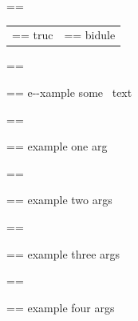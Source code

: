 \documentclass{book}
\makeatletter
\newenvironment{Texinfopreformatted}{%
  \par\GNUTobeylines\obeyspaces\frenchspacing\parskip=\z@\parindent=\z@}{}
{\catcode`\^^M=13 \gdef\GNUTobeylines{\catcode`\^^M=13 \def^^M{\null\par}}}
\newenvironment{Texinfoindented}{\begin{list}{}{}\item\relax}{\end{list}}
\renewcommand{\_}{\Texinfounderscore\discretionary{}{}{}}
\makeatother
\begin{document}
{{\begin{Texinfoindented}
\begin{Texinfopreformatted}
\end{Texinfopreformatted}
\begin{tabular}{m{} m{}}%
\begin{Texinfopreformatted}%
\ttfamily truc \end{Texinfopreformatted}&
\begin{Texinfopreformatted}%
\ttfamily bidule
\end{Texinfopreformatted}\\
\end{tabular}%
\begin{Texinfopreformatted}%
\ttfamily 
\end{Texinfopreformatted}
\begin{Texinfoindented}
\begin{Texinfopreformatted}%
\ttfamily e{-}{-}xample  some
\   text
\end{Texinfopreformatted}
\end{Texinfoindented}
\begin{Texinfopreformatted}%
\ttfamily 
\end{Texinfopreformatted}
\begin{Texinfoindented}
\begin{Texinfopreformatted}%
\ttfamily example one arg
\end{Texinfopreformatted}
\end{Texinfoindented}
\begin{Texinfopreformatted}%
\ttfamily 
\end{Texinfopreformatted}
\begin{Texinfoindented}
\begin{Texinfopreformatted}%
\ttfamily example two args
\end{Texinfopreformatted}
\end{Texinfoindented}
\begin{Texinfopreformatted}%
\ttfamily 
\end{Texinfopreformatted}
\begin{Texinfoindented}
\begin{Texinfopreformatted}%
\ttfamily example three args
\end{Texinfopreformatted}
\end{Texinfoindented}
\begin{Texinfopreformatted}%
\ttfamily 
\end{Texinfopreformatted}
\begin{Texinfoindented}
\begin{Texinfopreformatted}%
\ttfamily example four args

\end{Texinfopreformatted}
\end{Texinfoindented}
\end{Texinfoindented}}}
\end{document}
